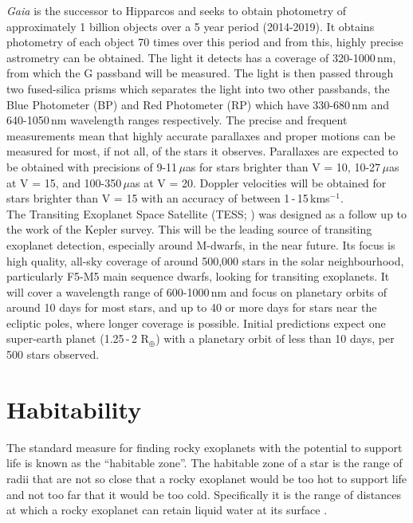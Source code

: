 {\em Gaia} \citep{2016Gaia} is the successor to Hipparcos and seeks to obtain photometry of approximately 1 billion objects over a 5 year period (2014-2019). It obtains photometry of each object 70 times over this period and from this, highly precise astrometry can be obtained. The light it detects has a coverage of 320-1000\,nm, from which the G passband will be measured. The light is then passed through two fused-silica prisms which separates the light into two other passbands, the Blue Photometer (BP) and Red Photometer (RP) which have 330-680\,nm and 640-1050\,nm wavelength ranges respectively. The precise and frequent measurements mean that highly accurate parallaxes and proper motions can be measured for most, if not all, of the stars it observes. Parallaxes are expected to be obtained with precisions of 9-11\,$\mu$as for stars brighter than V = 10, 10-27\,$\mu$as at V = 15, and 100-350\,$\mu$as at V = 20. Doppler velocities will be obtained for stars brighter than V = 15 with an accuracy of between 1\,-\,15\,kms$^{-1}$.\\

The Transiting Exoplanet Space Satellite (TESS; \citealt{2009Ricker}) was designed as a follow up to the work of the Kepler survey. This will be the leading source of transiting exoplanet detection, especially around M-dwarfs, in the near future. Its focus is high quality, all-sky coverage of around 500,000 stars in the solar neighbourhood, particularly F5-M5 main sequence dwarfs, looking for transiting exoplanets. It will cover a wavelength range of 600-1000\,nm and focus on planetary orbits of around 10 days for most stars, and up to 40 or more days for stars near the ecliptic poles, where longer coverage is possible. Initial predictions expect one super-earth planet (1.25\,-\,2 R$_{\oplus}$) with a planetary orbit of less than 10 days, per 500 stars observed.
\section{Habitability}
\label{SecHab}
The standard measure for finding rocky exoplanets with the potential to support life is known as the ``habitable zone''. The habitable zone of a star is the range of radii that are not so close that a rocky exoplanet would be too hot to support life and not too far that it would be too cold. Specifically it is the range of distances at which a rocky exoplanet can retain liquid water at its surface \citep{1993Kasting}.\\

